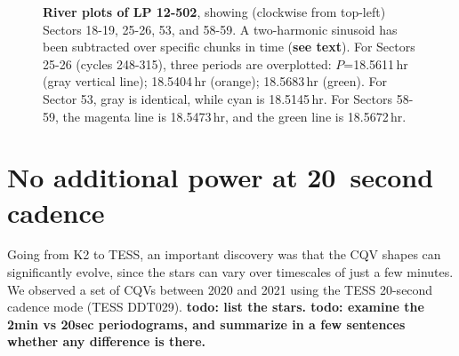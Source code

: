 \documentclass[11pt,twocolumn,tighten]{aastex63}
\begin{document}
\begin{figure*}[!t]
	\begin{center}
	\vspace{-1cm}
	\end{center}
	\vspace{-0.4cm}
	\caption{
    {\bf River plots of LP 12-502}, showing (clockwise from top-left)
    Sectors 18-19, 25-26, 53, and 58-59.  A two-harmonic sinusoid has
    been subtracted over specific chunks in time ({\bf see text}).
    For Sectors 25-26 (cycles 248-315), three periods are overplotted:
    $P$=18.5611\,hr (gray vertical line); 18.5404\,hr (orange); 18.5683\,hr (green).
    For Sector 53, gray is identical, while cyan is 18.5145\,hr.
    For Sectors 58-59, the magenta line is 18.5473\,hr, and the green
    line is 18.5672\,hr.
	}
	\label{fig:lpriver0}
\end{figure*}

%


\section{No additional power at 20~second cadence}

Going from K2 to TESS, an important discovery was that the CQV shapes
can significantly evolve, since the stars can vary over timescales of just a few minutes.
We observed a set of CQVs between 2020 and 2021 using the TESS 20-second
cadence mode (TESS DDT029).
{\bf todo: list the stars.  todo: examine the 2min vs 20sec periodograms, and summarize in a few
sentences whether any difference is there.}






\clearpage
\listofchanges
\end{document}

